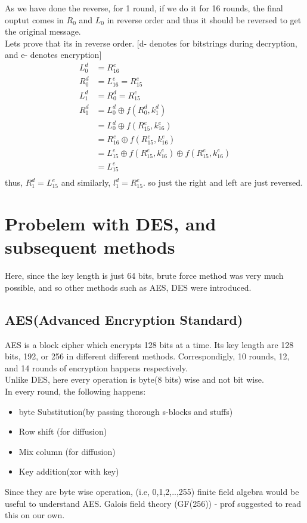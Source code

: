 \documentclass[english, 11pt]{article}
\begin{document}
As we have done the reverse, for 1 round, if we do it for 16 rounds, the final ouptut comes in $R_0$ and $L_0$ in reverse order and thus it should be reversed to get the original message.\\
Lets prove that its in reverse order. [d- denotes for bitstrings during decryption, and e- denotes encryption]
\begin{align*}
  L_0^d &= R_{16}^e \\
  R_0^d &= L_{16}^e = R_{15}^e \\
  L_1^d &= R_{0}^d = R_{15}^e \\
  R_1^d &= L_0^d \oplus f(R_0^d, k_1^d) \\
  &= L_0^d \oplus f(R_15^e, k_16^e) \\
  &= R_16^e \oplus f(R_15^e, k_16^e) \\
  &= L_15^e \oplus f(R_15^e, k_16^e) \oplus f(R_15^e, k_16^e) \\
  &= L_15^e \\
\end{align*}
thus, $R_1^d=L_15^e$ and similarly, $l_1^d=R_15^e$. so just the right and left are just reversed.

\section*{Probelem with DES, and subsequent methods}
Here, since the key length is just 64 bits, brute force method was very much possible, and so other methods such as AES, DES were introduced.\\
\subsection*{AES(Advanced Encryption Standard)}
AES is a block cipher which encrypts 128 bits at a time. Its key length are 128 bits, 192, or 256 in different different methods. Correspondigly, 10 rounds, 12, and 14 rounds of encryption happens respectively.\\
Unlike  DES, here every operation is byte(8 bits) wise and not bit wise.\\
In every round, the following happens:
\begin{itemize}
  \item byte Substitution(by passing thorough s-blocks and stuffs)
  \item Row shift (for diffusion)
  \item Mix column (for diffusion)
  \item Key addition(xor with key)
\end{itemize}
Since they are byte wise operation, (i.e, {0,1,2,..,255}) finite field algebra would be useful to understand AES.
Galois field theory (GF(256)) - prof suggested to read this on our own.
\end{document}

